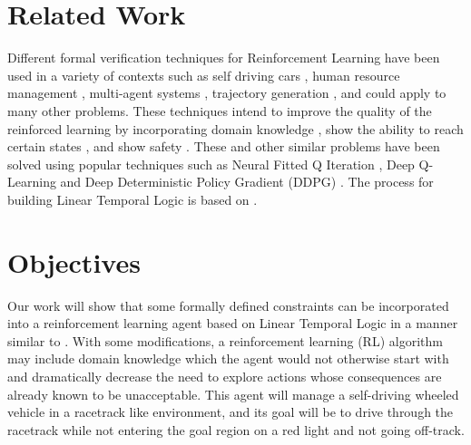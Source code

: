 \documentclass{article}
\begin{document}
\section{Related Work}
Different formal verification techniques for Reinforcement Learning have been used in a variety of contexts such as self driving cars \cite{https://doi.org/10.48550/arxiv.1904.07189}, human resource management \cite{10.1145/3577204}, multi-agent systems \cite{9357415}, trajectory generation \cite{9287929}, and could apply to many other problems. These techniques intend to improve the quality of the reinforced learning by incorporating domain knowledge \cite{https://doi.org/10.48550/arxiv.1801.08099}, show the ability to reach certain states \cite{9357415}, and show safety \cite{9724872}. These and other similar problems have been solved using popular techniques such as Neural Fitted Q Iteration \cite{10.1007/11564096_32}, Deep Q-Learning \cite{https://doi.org/10.48550/arxiv.1801.08099} and Deep Deterministic Policy Gradient (DDPG) \cite{https://doi.org/10.48550/arxiv.1509.02971}. The process for building Linear Temporal Logic is based on \cite{10.1007/978-3-319-41540-6_17}.

\section{Objectives}
Our work will show that some formally defined constraints can be incorporated into a reinforcement learning agent based on Linear Temporal Logic in a manner similar to \cite{https://doi.org/10.48550/arxiv.1801.08099}\cite{https://doi.org/10.48550/arxiv.1904.07189}. With some modifications, a reinforcement learning (RL) algorithm may include domain knowledge which the agent would not otherwise start with and dramatically decrease the need to explore actions whose consequences are already known to be unacceptable. This agent will manage a self-driving wheeled vehicle in a racetrack like environment, and its goal will be to drive through the racetrack while not entering the goal region on a red light and not going off-track.
\end{document}
